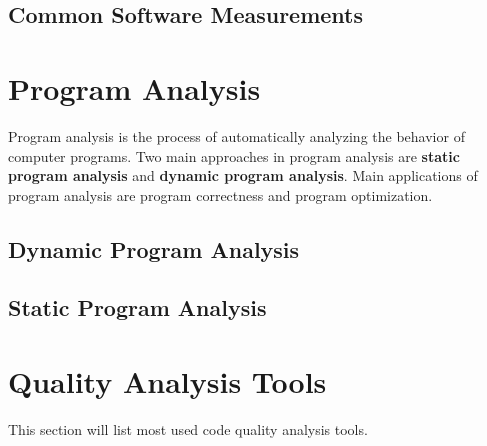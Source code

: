 \subsection{Common Software Measurements}

\section{Program Analysis}
Program analysis is the process of automatically analyzing the behavior of computer programs. Two main approaches in program analysis are \textbf{static program analysis} and \textbf{dynamic program analysis}. Main applications of program analysis are program correctness and program optimization.
\subsection{Dynamic Program Analysis}
\subsection{Static Program Analysis}

\section{Quality Analysis Tools}
This section will list most used code quality analysis tools.

